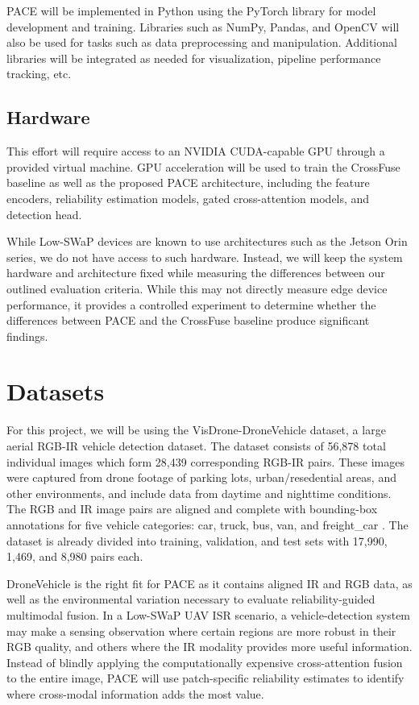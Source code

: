\documentclass[conference]{IEEEtran}
\begin{document}
PACE will be implemented in Python using the PyTorch library for model development and training. Libraries such as NumPy, Pandas, and OpenCV will also be used for tasks such as data preprocessing and manipulation. Additional libraries will be integrated as needed for visualization, pipeline performance tracking, etc. 

\subsection{Hardware}

This effort will require access to an NVIDIA CUDA-capable GPU through a provided virtual machine. GPU acceleration will be used to train the CrossFuse baseline as well as the proposed PACE architecture, including the feature encoders, reliability estimation models, gated cross-attention models, and detection head.

While Low-SWaP devices are known to use architectures such as the Jetson Orin series, we do not have access to such hardware. Instead, we will keep the system hardware and architecture fixed while measuring the differences between our outlined evaluation criteria. While this may not directly measure edge device performance, it provides a controlled experiment to determine whether the differences between PACE and the CrossFuse baseline produce significant findings.



\section{Datasets}

For this project, we will be using the VisDrone-DroneVehicle dataset, a large aerial RGB-IR vehicle detection dataset. The dataset consists of 56,878 total individual images which form 28,439 corresponding RGB-IR pairs. These images were captured from drone footage of parking lots, urban/resedential areas, and other environments, and include data from daytime and nighttime conditions. The RGB and IR image pairs are aligned and complete with bounding-box annotations for five vehicle categories: car, truck, bus, van, and freight\_car \cite{dronevehicle}. The dataset is already divided into training, validation, and test sets with 17,990, 1,469, and 8,980 pairs each\cite{dronevehicle}.

DroneVehicle is the right fit for PACE as it contains aligned IR and RGB data, as well as the environmental variation necessary to evaluate reliability-guided multimodal fusion. In a Low-SWaP UAV ISR scenario, a vehicle-detection system may make a sensing observation where certain regions are more robust in their RGB quality, and others where the IR modality provides more useful information. Instead of blindly applying the computationally expensive cross-attention fusion to the entire image, PACE will use patch-specific reliability estimates to identify where cross-modal information adds the most value. 
\end{document}
